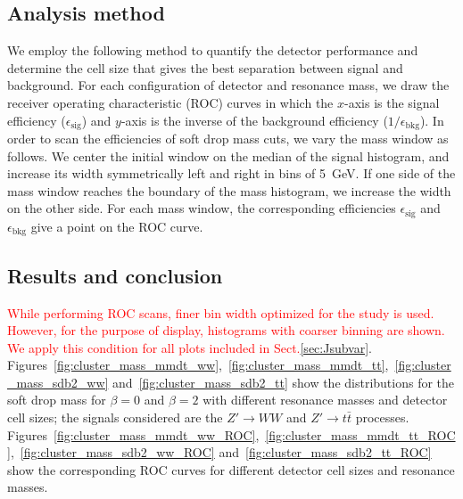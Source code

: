 \subsection{Analysis method \label{sec:massana}}
We employ the following method to quantify the detector performance and 
determine the cell size that gives the best separation between  
signal and background. For each configuration of detector and resonance mass, 
we draw the receiver operating characteristic (ROC) curves in which the $x$-axis
 is the signal efficiency ($\epsilon_\mathrm{sig}$) and $y$-axis is the inverse 
of the background efficiency ($1/\epsilon_\mathrm{bkg}$). 
In order to scan the efficiencies of soft drop mass cuts, we vary the mass 
window as follows. We center the initial window on the median of the signal histogram, and increase its width symmetrically left and right in bins of 5~GeV. 
If one side of the mass window reaches the boundary 
of the mass histogram, we increase the width on the other side. For each mass window, the corresponding efficiencies 
$\epsilon_\mathrm{sig}$ and $\epsilon_\mathrm{bkg}$ give a point on 
the ROC curve.

\subsection{Results and conclusion}\label{Rebin_section}

\textcolor{red}{While performing ROC scans, finer bin width optimized for the study is used. However, for the purpose of display, histograms with coarser binning are shown. We apply this condition for all plots included in Sect.\ref{sec:Jsubvar}}. Figures~\ref{fig:cluster_mass_mmdt_ww},~\ref{fig:cluster_mass_mmdt_tt},~\ref{fig:cluster_mass_sdb2_ww} and~\ref{fig:cluster_mass_sdb2_tt} 
show the distributions for the soft drop mass for $\beta=0$ and $\beta=2$ with  
different resonance masses and detector cell sizes; the signals considered are 
the $Z'\rightarrow WW$ and $Z'\rightarrow t\bar{t}$ processes. 
Figures~\ref{fig:cluster_mass_mmdt_ww_ROC},~\ref{fig:cluster_mass_mmdt_tt_ROC},~\ref{fig:cluster_mass_sdb2_ww_ROC} and~\ref{fig:cluster_mass_sdb2_tt_ROC} 
show the corresponding ROC curves for different detector cell sizes and resonance masses.

